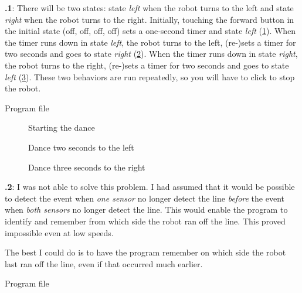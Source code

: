 \documentclass[11pt,a4paper,english]{article}
\begin{document}
\textbf{\thesection.1}:
There will be two states: state \emph{left}  when the
robot turns to the left and state \emph{right}  when
the robot turns to the right. Initially, touching the forward button in
the initial state (off, off, off, off) sets a one-second timer and state
\emph{left} (\cref{fig.dance-start}). When the timer runs down in
state \emph{left}, the robot turns to the left, (re-)sets a timer for
two seconds and goes to state \emph{right}
(\cref{fig.dance-left}). When the timer runs down in state
\emph{right}, the robot turns to the right, (re-)sets a timer for two
seconds and goes to state \emph{left} (\cref{fig.dance-right}).
These two behaviors are run repeatedly, so you will have to click
 to stop the robot.

{\raggedleft \hfill Program file }


\begin{figure}
\begin{center}
\caption{Starting the dance}\label{fig.dance-start}
\end{center}
\end{figure}

\begin{figure}
\begin{center}
\caption{Dance two seconds to the left}\label{fig.dance-left}
\end{center}
\end{figure}

\begin{figure}
\begin{center}
\caption{Dance three seconds to the right}\label{fig.dance-right}
\end{center}
\end{figure}

\newpage

\textbf{\thesection.2}:
I was not able to solve this problem. I had assumed that it would be
possible to detect the event when \emph{one sensor} no longer detect the
line \emph{before} the event when \emph{both sensors} no longer detect
the line. This would enable the program to identify and remember from
which side the robot ran off the line. This proved impossible even at
low speeds.

The best I could do is to have the program remember on which side the
robot last ran off the line, even if that occurred much earlier.

{\raggedleft \hfill Program file }
\end{document}
